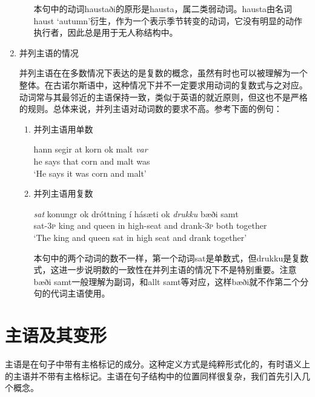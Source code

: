 \begin{enumerate}
\begin{enumerate}
                    本句中的动词haustaði的原形是hausta，属二类弱动词。hausta由名词haust `autumn’衍生，作为一个表示季节转变的动词，它没有明显的动作执行者，因此总是用于无人称结构中。
          \end{enumerate}

    \item 并列主语的情况

          并列主语在在多数情况下表达的是复数的概念，虽然有时也可以被理解为一个整体。在古诺尔斯语中，这种情况下并不一定要求用动词的复数式与之对应。动词常与其最邻近的主语保持一致，类似于英语的就近原则，但这也不是严格的规则。总体来说，并列主语对动词数的要求不高。参考下面的例句：
          \begin{enumerate}
              \setlength{\parindent}{2em}
              \item 并列主语用单数
                    \begin{exe}
                        \ex
                        \gll hann	segir	at	korn	ok	malt	\textit{var}\\
                        he	says	that	corn	and	malt	was\\
                        \trans `He says it was corn and malt’
                    \end{exe}

              \item 并列主语用复数
                    \begin{exe}
                        \ex
                        \gll \textit{sat}	konungr	ok	dróttning	í	hásæti ok	\textit{drukku}	bæði	samt\\
                        sat-{\footnotesize 3}\textsc{p}	king	and	queen	in	high-seat and	drank-{\footnotesize 3}\textsc{p}	both	together\\
                        \trans `The king and queen sat in high seat and drank together’
                    \end{exe}
                    本句中的两个动词的数不一样，第一个动词sat是单数式，但drukku是复数式，这进一步说明数的一致性在并列主语的情况下不是特别重要。注意bæði samt一般理解为副词，和allt samt等对应，这样bæði就不作第二个分句的代词主语使用。
          \end{enumerate}


\end{enumerate}
\section{主语及其变形}
主语是在句子中带有主格标记的成分。这种定义方式是纯粹形式化的，有时语义上的主语并不带有主格标记。主语在句子结构中的位置同样很复杂，我们首先引入几个概念。

